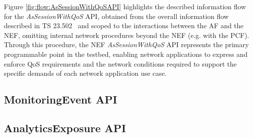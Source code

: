 Figure \ref{fig:flow:AsSessionWithQoSAPI} highlights the described information flow for the \textit{AsSessionWithQoS} \acs{API}, obtained from the overall information flow described in TS 23.502~\cite{3GPP-23.502} and scoped to the interactions between the \acs{AF} and the \acs{NEF}, omitting internal network procedures beyond the \acs{NEF} (e.g. with the \acs{PCF}). Through this procedure, the \acs{NEF} \textit{AsSessionWithQoS} \acs{API} represents the primary programmable point in the testbed, enabling network applications to express and enforce \acs{QoS} requirements and the network conditions required to support the specific demands of each network application use case.

\subsection{MonitoringEvent \acs{API}}
\label{chap:proposal:exposure:nef:MonitoringEvent}


\subsection{AnalyticsExposure \acs{API}}
\label{chap:proposal:exposure:nef:AnalyticsExposure}

